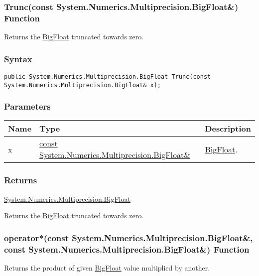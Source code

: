 \documentclass[a4paper,oneside,11.000000pt]{book}
\begin{document}
\hypertarget{System.Numerics.Multiprecision.Trunc.C.R.System.Numerics.Multiprecision.BigFloat}{\subsubsection*{Trunc(const System.Numerics.Multiprecision.BigFloat\&) Function}}
\begin{flushleft}
Returns the \hyperlink{System.Numerics.Multiprecision.BigFloat}{BigFloat} truncated towards zero.

\end{flushleft}
\subsubsection*{Syntax}
\texttt{public System.Numerics.Multiprecision.BigFloat Trunc(const System.Numerics.Multiprecision.BigFloat\& x);}
\subsubsection*{Parameters}
\begin{flushleft}
\begin{supertabular}[l]{!{\raggedright}p{1.30721cm}!{\raggedright}p{8.55945cm}!{\raggedright}p{2.65538cm}}
\textbf{Name}
& \textbf{Type}
& \textbf{Description}
\\
\hline
x
& \hyperlink{System.Numerics.Multiprecision.BigFloat}{const System.\-Numerics.\-Multiprecision.\-BigFloat\&\-}
& \hyperlink{System.Numerics.Multiprecision.BigFloat}{BigFloat}.

\\
\end{supertabular}

\end{flushleft}
\subsubsection*{Returns}
\hyperlink{System.Numerics.Multiprecision.BigFloat}{System.\-Numerics.\-Multiprecision.\-BigFloat}
\begin{flushleft}
Returns the \hyperlink{System.Numerics.Multiprecision.BigFloat}{BigFloat} truncated towards zero.

\end{flushleft}
\clearpage

\hypertarget{System.Numerics.Multiprecision.operator.times.C.R.System.Numerics.Multiprecision.BigFloat.C.R.System.Numerics.Multiprecision.BigFloat}{\subsubsection*{operator*(const System.Numerics.Multiprecision.BigFloat\&, const System.Numerics.Multiprecision.BigFloat\&) Function}}
\begin{flushleft}
Returns the product of given \hyperlink{System.Numerics.Multiprecision.BigFloat}{BigFloat} value multiplied by another.

\end{flushleft}
\end{document}
